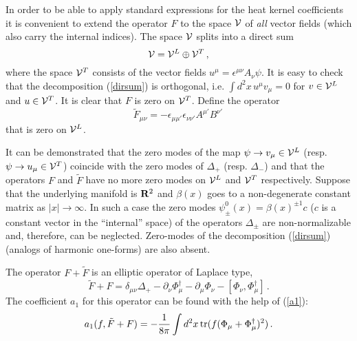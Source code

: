 \documentclass[a4paper,12pt]{article}
\begin{document}
In order to be able to apply standard expressions for the
heat kernel coefficients it is convenient to extend the
operator $F$ to the space ${\cal V}$ of {\it all}
vector fields (which also carry the internal indices). 
The space ${\cal V}$ splits into a
direct sum
\begin{equation}
{\cal V}={\cal V}^L\oplus {\cal V}^T \,,
\label{dirsum}
\end{equation}
where the space ${\cal V}^T$ consists of the vector
fields $u^\mu =\epsilon^{\mu\nu}A_\nu \psi$. It is easy
to check that the decomposition (\ref{dirsum}) is orthogonal,
i.e. $\int d^2x\,u^\mu v_\mu =0$ for $v\in {\cal V}^L$
and $u \in {\cal V}^T$. It is clear that $F$ is zero on
${\cal V}^T$. Define the operator
\begin{equation}
\tilde F_{\mu\nu}=-\epsilon_{\mu\mu'}\epsilon_{\nu\nu'}
A^{\mu'}B^{\nu'} \, \label{defFtil}
\end{equation}
that is zero on ${\cal V}^L$.

It can be demonstrated that the zero modes of the map
$\psi \to v_\mu \in {\cal V}^L$ (resp. 
$\psi \to u_\mu \in {\cal V}^T$) coincide with the zero
modes of $\Delta_+$ (resp. $\Delta_-$) and that the
operators $F$ and $\tilde F$ have no more zero
modes on ${\cal V}^L$ and ${\cal V}^T$ respectively.
Suppose that the underlying manifold is ${\bf R}^2$
and $\beta (x)$ goes to a non-degenerate
constant matrix as $|x|\to\infty$.
In such a case the zero modes $\psi^0_\pm (x) =\beta (x)^{\pm 1}c$
($c$ is a constant vector in the ``internal'' space) of the
operators $\Delta_\pm$ are non-normalizable and, therefore,
can be neglected.
Zero-modes of the decomposition (\ref{dirsum}) (analogs
of harmonic one-forms) are also absent.

The operator $F+\tilde F$ is an elliptic operator
of Laplace type,
\begin{equation}
\tilde F+F = \delta_{\mu\nu}\Delta_+ -\partial_\nu \Phi_\mu^\dag
-\partial_\mu\Phi_\nu -[\Phi_\nu ,\Phi_\mu^\dag ] \,.
\label{F+F}
\end{equation}
The coefficient $a_1$ for this operator can be found
with the help of (\ref{a1}):
\begin{equation}
a_1(f,\tilde F+F) =-\frac 1{8\pi} \int d^2x\,
{\rm tr} (f(\Phi_\mu +\Phi_\mu^\dag )^2)\,.
\label{a1FF}
\end{equation}
\end{document}
